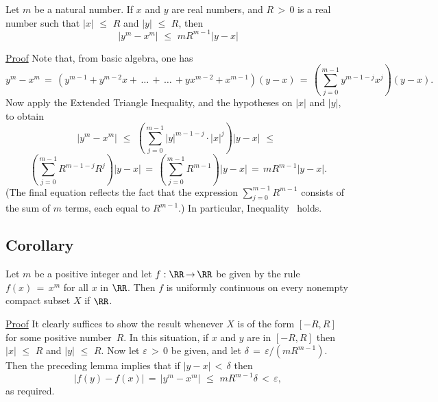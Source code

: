 {        Let $m$ be a natural number. If $x$ and $y$ are real numbers, and $R\,>\,0$ is a real number such that $|x|\,\,{\leq}\,\,R$ and $|y|\,\,{\leq}\,\,R$, then
        \begin{equation}
        \label{IneqD.30A} %
        |y^{m}-x^{m}|\,\,{\leq}\,\,mR^{m-1}|y-x|
        \end{equation}

\V

        \underline{Proof} Note that, from basic algebra, one has
        \begin{equation}
        \label{EqnD.30B}
        y^{m}-x^{m} \,=\, (y^{m-1}+y^{m-2}x+\,{\ldots}\,+\,{\ldots}\, +yx^{m-2}+x^{m-1})(y-x) \,=\, \left(\sum_{j=0}^{m-1} y^{m-1-j}x^{j}\right)(y-x).
        \end{equation}
    Now apply the Extended Triangle Inequality, and the hypotheses on $|x|$ and $|y|$, to obtain
        \begin{displaymath}
        |y^{m}-x^{m}|\,\,{\leq}\,\,\left(\sum_{j=0}^{m-1} |y|^{m-1-j}{\cdot}|x|^{j}\right)|y-x|
    \,\,{\leq}\,\,
       \end{displaymath}
        \begin{displaymath}
    \left(\sum_{j=0}^{m-1} R^{m-1-j}R^{j}\right)|y-x| \,=\, \left(\sum_{j=0}^{m-1} R^{m-1}\right)|y-x| \,=\, mR^{m-1}|y-x|.
        \end{displaymath}
    (The final equation reflects the fact that the expression $\sum_{j=0}^{m-1} R^{m-1}$ consists of the sum of $m$ terms, each equal to $R^{m-1}$.)
    In particular, Inequality~ holds. \Q

\V

            \subsection{\small{\bf Corollary}} 
            \label{CorD60.35B}

\V

        Let $m$ be a positive integer and let $f:{\RR} \,{\rightarrow}\, {\RR}$ be given by the rule $f(x) \,=\, x^{m}$ for all $x$ in ${\RR}$.
    Then $f$ is uniformly continuous on every nonempty compact subset $X$ if ${\RR}$.

\V

        \underline{Proof} It clearly suffices to show the result whenever $X$ is of the form $[-R,R]$ for some positive number~$R$.
    In this situation, if $x$ and $y$ are in $[-R,R]$ then $|x|\,\,{\leq}\,\,R$ and $|y|\,\,{\leq}\,\,R$.
    Now let ${\varepsilon}\,>\,0$ be given, and let ${\delta} \,=\, {\varepsilon}/(mR^{m-1})$.
    Then the preceding lemma implies that if $|y-x|\,<\,{\delta}$ then
        \begin{displaymath}
        |f(y)-f(x)| \,=\, |y^{m} - x^{m}|\,\,{\leq}\,\,mR^{m-1}{\delta}\,<\,{\varepsilon},
        \end{displaymath}
    as required. \Q


}

